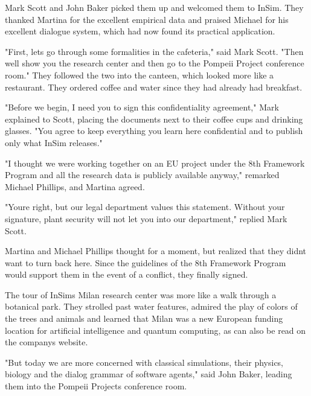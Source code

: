 \documentclass[
]{article}
\begin{document}
Mark Scott and John Baker picked them up and welcomed them to InSim.
They thanked Martina for the excellent empirical data and praised
Michael for his excellent dialogue system, which had now found its
practical application.

"First, let\textquotesingle s go through some formalities in the
cafeteria," said Mark Scott. "Then we\textquotesingle ll show you the
research center and then go to the Pompeii Project conference room."
They followed the two into the canteen, which looked more like a
restaurant. They ordered coffee and water since they had already had
breakfast.

"Before we begin, I need you to sign this confidentiality agreement,"
Mark explained to Scott, placing the documents next to their coffee cups
and drinking glasses. "You agree to keep everything you learn here
confidential and to publish only what InSim releases."

"I thought we were working together on an EU project under the 8th
Framework Program and all the research data is publicly available
anyway," remarked Michael Phillips, and Martina agreed.

"You\textquotesingle re right, but our legal department values
\hspace{0pt}\hspace{0pt}this statement. Without your signature, plant
security will not let you into our department," replied Mark Scott.

Martina and Michael Phillips thought for a moment, but realized that
they didn\textquotesingle t want to turn back here. Since the guidelines
of the 8th Framework Program would support them in the event of a
conflict, they finally signed.

The tour of InSim\textquotesingle s Milan research center was more like
a walk through a botanical park. They strolled past water features,
admired the play of colors of the trees and animals and learned that
Milan was a new European funding location for artificial intelligence
and quantum computing, as can also be read on the
company\textquotesingle s website.

"But today we are more concerned with classical simulations, their
physics, biology and the dialog grammar of software agents," said John
Baker, leading them into the Pompeii Project\textquotesingle s
conference room.
\end{document}
